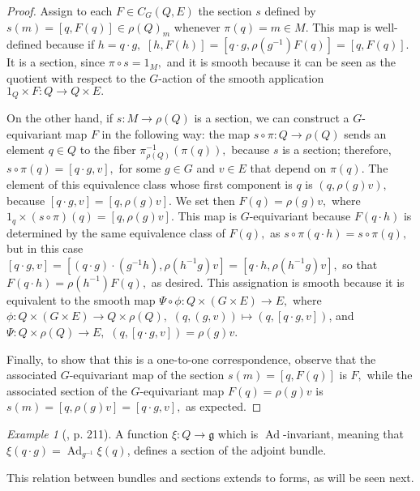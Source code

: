 \documentclass[12pt, letterpaper, reqno]{amsart}
\theoremstyle{definition}
\theoremstyle{plain}
\theoremstyle{remark}
\newtheorem{ex}{Example}
\begin{document}
\begin{proof}
	Assign to each $ F\in C_G(Q,E) $ the section $s $ defined by $s(m)=[q, F(q)]\in \rho(Q)_m $ whenever $ \pi(q)=m\in M. $  This map is well-defined because if $ h= q\cdot g, $ $ [h,F(h)]=[q\cdot g, \rho(g^{-1})F(q)]=[q,F(q)]$. It is a section, since $ \pi\circ s = 1_M, $ and it is smooth because it can be seen as the quotient with respect to the $ G $-action of the smooth application $ 1_Q\times F: Q \rightarrow Q\times E. $ 

	On the other hand, if $s: M \rightarrow \rho(Q)$ is a section, we can construct a $ G $-equivariant map $ F $ in the following way: the map $ s\circ\pi: Q \rightarrow  \rho(Q) $ sends an element $ q\in Q $ to the fiber $ \pi_{ \rho(Q)}^{-1}(\pi(q)), $ because $ s $ is a section; therefore, $ s\circ \pi(q)=[q\cdot g, v], $ for some $ g\in G $ and $ v\in E $ that depend on $ \pi(q). $ The element of this equivalence class whose first component is $ q $ is $ (q,\rho(g)v), $ because $ [q\cdot g, v] = [q,\rho(g)v]$. We set then $ F(q)=\rho(g)v, $ where $ 1_q\times(s\circ\pi)(q)=[q,\rho(g)v]. $ This map is $ G $-equivariant because $ F(q\cdot h) $ is determined by the same equivalence class of $ F(q), $ as $ s\circ\pi(q\cdot h)= s\circ \pi(q), $ but in this case $ [q\cdot g, v] = [(q\cdot g)\cdot(g^{-1}h), \rho(h^{-1}g)v] = [q\cdot h, \rho(h^{-1}g)v], $ so that $ F(q\cdot h) = \rho(h^{-1})F(q), $ as desired. This assignation is smooth because it is equivalent to the smooth map $ \Psi\circ \phi: Q\times(G\times E) \rightarrow E,$ where $ \phi: Q \times(G\times E) \rightarrow Q\times \rho(Q), $ $ (q,(g,v)) \mapsto (q, [q\cdot g, v]) $, and $ \Psi: Q\times \rho(Q) \rightarrow E, $ $ (q,[q\cdot g, v])=\rho(g)v. $    

	Finally, to show that this is a one-to-one correspondence, observe that the associated $ G $-equivariant map of the section $ s(m)=[q, F(q)] $ is $ F, $  while the associated section of the $ G $-equivariant map $ F(q)=\rho(g) v $ is $ s(m)=[q,\rho(g)v]=[q\cdot g, v], $ as expected.
\end{proof}

\begin{ex}[\cite{montgomery2002tour}, p. 211]
	A function $ \xi: Q \rightarrow \mathfrak{g}  $ which is $ \operatorname{Ad}  $-invariant, meaning that $ \xi(q\cdot g)= \operatorname{Ad}_{g^{-1}}\xi(q) $, defines a section of the adjoint bundle. 
\end{ex}

This relation between bundles and sections extends to forms, as will be seen next.
\end{document}
